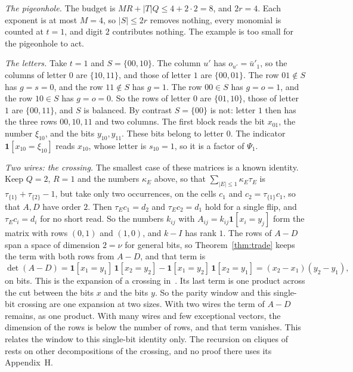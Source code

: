 \documentclass[11pt]{article}
\numberwithin{equation}{section}
\theoremstyle{remark}
\begin{document}
\medskip\noindent\emph{The pigeonhole.} The budget is $MR+|T|Q\le4+2\cdot2=8$, and $2r=4$. Each exponent is at most $M=4$, so $|S|\le2r$ removes nothing, every monomial is counted at $t=1$, and digit $2$ contributes nothing. The example is too small for the pigeonhole to act.

\medskip\noindent\emph{The letters.} Take $t=1$ and $S=\{00,10\}$. The column $u'$ has $o_{u'}=\bar u'_1$, so the columns of letter $0$ are $\{10,11\}$, and those of letter $1$ are $\{00,01\}$. The row $01\notin S$ has $g=s=0$, and the row $11\notin S$ has $g=1$. The row $00\in S$ has $g=o=1$, and the row $10\in S$ has $g=o=0$. So the rows of letter $0$ are $\{01,10\}$, those of letter $1$ are $\{00,11\}$, and $S$ is balanced. By contrast $S=\{00\}$ is not: letter $1$ then has the three rows $00,10,11$ and two columns. The first block reads the bit $x_{01}$, the number $\xi_{10}$, and the bits $y_{10},y_{11}$. These bits belong to letter $0$. The indicator $\mathbf 1[x_{10}=\xi_{10}]$ reads $x_{10}$, whose letter is $s_{10}=1$, so it is a factor of $\Psi_1$.

\medskip\noindent\emph{Two wires: the crossing.} The smallest case of these matrices is a known identity. Keep $Q=2$, $R=1$ and the numbers $\kappa_E$ above, so that $\sum_{|E|\le1}\kappa_E\tau_E$ is $\tau_{\{1\}}+\tau_{\{2\}}-1$, but take only two occurrences, on the cells $c_1$ and $c_2=\tau_{\{1\}}c_1$, so that $A,D$ have order $2$. Then $\tau_Ec_1=d_2$ and $\tau_Ec_2=d_1$ hold for a single flip, and $\tau_Ec_i=d_i$ for no short read. So the numbers $k_{ij}$ with $A_{ij}=k_{ij}\mathbf 1[x_i=y_j]$ form the matrix with rows $(0,1)$ and $(1,0)$, and $k-I$ has rank $1$. The rows of $A-D$ span a space of dimension $2=\nu$ for general bits, so Theorem~\ref{thm:trade} keeps the term with both rows from $A-D$, and that term is
\begin{equation}\label{eq:skein}
\det(A-D)=\mathbf 1[x_1=y_1]\,\mathbf 1[x_2=y_2]-\mathbf 1[x_1=y_2]\,\mathbf 1[x_2=y_1]=(x_2-x_1)(y_2-y_1),
\end{equation}
on bits. This is the expansion of a crossing in~\cite[Appendix~H]{Cla26}. Its last term is one product across the cut between the bits $x$ and the bits $y$. So the parity window and this single-bit crossing are one expansion at two sizes. With two wires the term of $A-D$ remains, as one product. With many wires and few exceptional vectors, the dimension of the rows is below the number of rows, and that term vanishes. This relates the window to this single-bit identity only. The recursion on cliques of~\cite{Cla26} rests on other decompositions of the crossing, and no proof there uses its Appendix~H.
\end{document}
